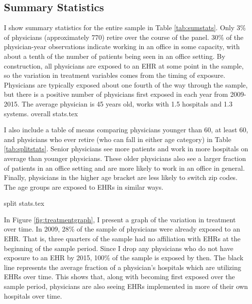 \documentclass[12pt]{article}
\begin{document}
\subsection{Summary Statistics}

I show summary statistics for the entire sample in Table \ref{tab:sumstats}. Only 3\% of physicians (approximately 770) retire over the course of the panel. 30\% of the physician-year observations indicate working in an office in some capacity, with about a tenth of the number of patients being seen in an office setting. By construction, all physicians are exposed to an EHR at some point in the sample, so the variation in treatment variables comes from the timing of exposure. Physicians are typically exposed about one fourth of the way through the sample, but there is a positive number of physicians first exposed in each year from 2009-2015. The average physician is 45 years old, works with 1.5 hospitals and 1.3 systems. 
{overall stats.tex}


I also include a table of means comparing physicians younger than 60, at least 60, and physicians who ever retire (who can fall in either age category) in Table \ref{tab:splitstats}. Senior physicians see more patients and work in more hospitals on average than younger physicians. These older physicians also see a larger fraction of patients in an office setting and are more likely to work in an office in general. Finally, physicians in the higher age bracket are less likely to switch zip codes. The age groups are exposed to EHRs in similar ways.


{split stats.tex}


In Figure \ref{fig:treatmentgraph}, I present a graph of the variation in treatment over time. In 2009, 28\% of the sample of physicians were already exposed to an EHR. That is, three quarters of the sample had no affiliation with EHRs at the beginning of the sample period. Since I drop any physicians who do not have exposure to an EHR by 2015, 100\% of the sample is exposed by then. The black line represents the average fraction of a physician's hospitals which are utilizing EHRs over time. This shows that, along with becoming first exposed over the sample period, physicians are also seeing EHRs implemented in more of their own hospitals over time.
\end{document}
